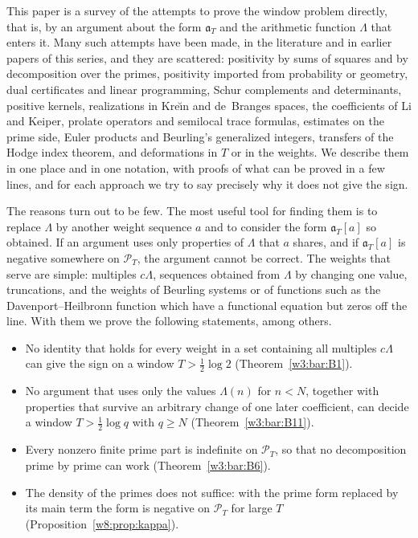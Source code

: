 \documentclass[11pt]{amsart}
\theoremstyle{definition}
\theoremstyle{remark}
\numberwithin{equation}{section}
\newcommand{\PT}{\mathcal{P}_T}                        %
\newcommand{\aT}{\mathfrak{a}_T}                       %
\begin{document}
This paper is a survey of the attempts to prove the window problem directly, that is, by an argument about the
form $\aT$ and the arithmetic function $\Lambda$ that enters it. Many such attempts have been made, in the
literature and in earlier papers of this series, and they are scattered: positivity by sums of squares and by
decomposition over the primes, positivity imported from probability or geometry, dual certificates and linear
programming, Schur complements and determinants, positive kernels, realizations in Kre\u{\i}n and de~Branges
spaces, the coefficients of Li and Keiper, prolate operators and semilocal trace formulas, estimates on the prime
side, Euler products and Beurling's generalized integers, transfers of the Hodge index theorem, and deformations
in $T$ or in the weights. We describe them in one place and in one notation, with proofs of what can be proved
in a few lines, and for each approach we try to say precisely why it does not give the sign.

The reasons turn out to be few. The most useful tool for finding them is to replace $\Lambda$ by another weight
sequence $a$ and to consider the form $\aT[a]$ so obtained. If an argument uses only properties of $\Lambda$ that
$a$ shares, and if $\aT[a]$ is negative somewhere on $\PT$, the argument cannot be correct. The weights that
serve are simple: multiples $c\Lambda$, sequences obtained from $\Lambda$ by changing one value, truncations,
and the weights of Beurling systems or of functions such as the Davenport--Heilbronn function which have a
functional equation but zeros off the line. With them we prove the following statements, among others.

\begin{itemize}
\item No identity that holds for every weight in a set containing all multiples $c\Lambda$ can give the sign on
a window $T>\frac12\log2$ (Theorem~\ref{w3:bar:B1}).
\item No argument that uses only the values $\Lambda(n)$ for $n<N$, together with properties that survive an
arbitrary change of one later coefficient, can decide a window $T>\frac12\log q$ with $q\ge N$
(Theorem~\ref{w3:bar:B11}).
\item Every nonzero finite prime part is indefinite on $\PT$, so that no decomposition prime by prime can work
(Theorem~\ref{w3:bar:B6}).
\item The density of the primes does not suffice: with the prime form replaced by its main term the form is
negative on $\PT$ for large $T$ (Proposition~\ref{w8:prop:kappa}).
\end{itemize}
\end{document}
